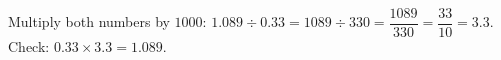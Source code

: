 Multiply both numbers by $1000$: $1.089\div0.33=1089\div330=\dfrac{1089}{330}=\dfrac{33}{10}=\boxed{3.3}$. Check: $0.33\times3.3=1.089$.
